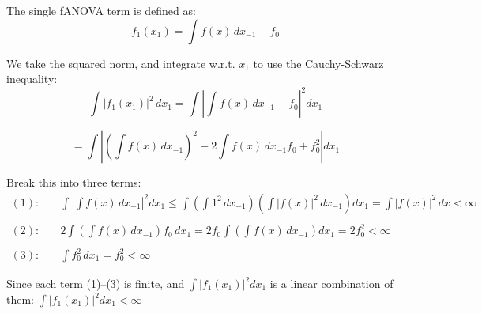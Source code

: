 The single fANOVA term is defined as:
\[
f_1(x_1) = \int f(x) \, dx_{-1} - f_0
\]

We take the squared norm, and integrate w.r.t. \( x_1 \) to use the Cauchy-Schwarz inequality:
\[
\int |f_1(x_1)|^2 \, dx_1 
= \int \left| \int f(x) \, dx_{-1} - f_0 \right|^2 dx_1
\]

\[
= \int | (\int f(x) \, dx_{-1})^2 
- 2 \int f(x) \, dx_{-1} f_0 
+ f_0^2 | dx_1
\]

Break this into three terms:
\begin{align*}
(1): &\quad \int \left| \int f(x) \, dx_{-1} \right|^2 dx_1 
\leq \int \left( \int 1^2 \, dx_{-1} \right) \left( \int |f(x)|^2 \, dx_{-1} \right) dx_1 
= \int |f(x)|^2 \, dx < \infty \\
\\
(2): &\quad 2 \int \left( \int f(x) \, dx_{-1} \right) f_0 \, dx_1 
= 2 f_0 \int \left( \int f(x) \, dx_{-1} \right) dx_1 
= 2 f_0^2 < \infty \\
\\
(3): &\quad \int f_0^2 \, dx_1 = f_0^2 < \infty
\end{align*}

Since each term (1)–(3) is finite, and \( \int |f_1(x_1)|^2 dx_1 \) is a linear combination of them: \(\int |f_1(x_1)|^2 dx_1 < \infty\)




